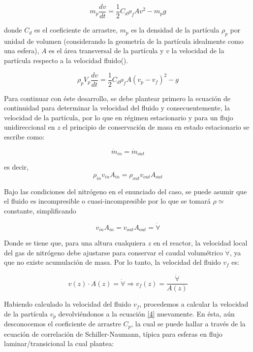 \documentclass[11pt,stdletter,orderfromtodate,sigleft,twoside]{report}
\begin{document}
\begin{equation}
    m_{p}\frac{dv}{dt}=\frac{1}{2}C_{d}\rho_f A v^{2}-m_{p}g
\end{equation}

donde $C_d$ es el coeficiente de arrastre, $m_p$ es la densidad de la partícula $\rho_p$ por unidad de volumen (considerando la geometría de la partícula idealmente como una esfera), $A$ es el área transversal de la partícula y $v$ la velocidad de la partícula respecto a la velocidad fluido(\cite{white2011fluid}).

\begin{equation}
    \rho_pV_p\frac{dv}{dt}=\frac{1}{2}C_{d}\rho_fA(v_{p}-v_{f})^{2}-g
    \label{4}
\end{equation}

Para continuar con éste desarrollo, se debe plantear primero la ecuación de continuidad para determinar la velocidad del fluido y consecuentemente, la velocidad de la partícula, por lo que en régimen estacionario y para un flujo unidireccional en $z$ el principio de conservación de masa en estado estacionario se escribe como:

\begin{equation}
    \dot{m}_{in}=\dot{m}_{out}
\end{equation}

es decir,
\[
    \rho_{in}v_{in}A_{in}=\rho_{out}v_{out}A_{out}
\]

Bajo las condiciones del nitrógeno en el enunciado del caso, se puede asumir que el fluido es incompresible o cuasi-incompresible por lo que se tomará $\rho\simeq $ constante, simplificando

\begin{equation}
    v_{in}A_{in}=v_{out}A_{out}=\dot{\forall}
\end{equation}

Donde se tiene que, para una altura cualquiera $z$ en el reactor, la velocidad local del gas de nitrógeno debe ajustarse para conservar el caudal volumétrico $\dot{\forall}$, ya que no existe acumulación de masa. Por lo tanto, la velocidad del fluido $v_f$ es:

\begin{equation}
    v(z)\cdot A(z)=\dot{\forall} \Rightarrow v_f(z)=\frac{\dot{\forall}}{A(z)}
    \label{Vel_f}
\end{equation}

Habiendo calculado la velocidad del fluido $v_f$, procedemos a calcular la velocidad de la partícula $v_p$ devolviéndonos a la ecuación \ref{4} nuevamente. En ésta, aún desconocemos el coeficiente de arrastre $C_p$, la cual se puede hallar a través de la ecuación de correlación de Schiller-Naumann, típica para esferas en flujo laminar/transicional la cual plantea:
\end{document}
